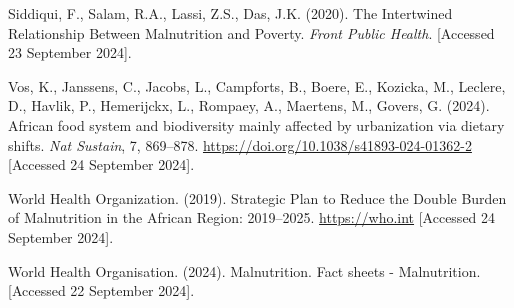 \documentclass[a4paper,11pt]{report}
\begin{document}
\begin{thebibliography}
	Siddiqui, F., Salam, R.A., Lassi, Z.S., Das, J.K. (2020). The Intertwined Relationship Between Malnutrition and Poverty. \textit{Front Public Health}. [Accessed 23 September 2024].
	
	Vos, K., Janssens, C., Jacobs, L., Campforts, B., Boere, E., Kozicka, M., Leclere, D., Havlik, P., Hemerijckx, L., Rompaey, A., Maertens, M., Govers, G. (2024). African food system and biodiversity mainly affected by urbanization via dietary shifts. \textit{Nat Sustain}, 7, 869–878. \url{https://doi.org/10.1038/s41893-024-01362-2} [Accessed 24 September 2024].
	
	World Health Organization. (2019). Strategic Plan to Reduce the Double Burden of Malnutrition in the African Region: 2019–2025. \url{https://who.int} [Accessed 24 September 2024].
	
	World Health Organisation. (2024). Malnutrition. Fact sheets - Malnutrition. [Accessed 22 September 2024].
	\end{thebibliography}
	
	
\end{document}
